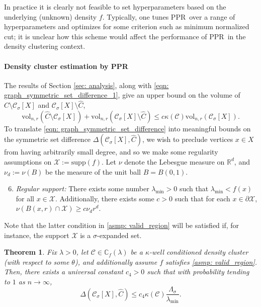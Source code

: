 \documentclass{article}
\newcommand{\vol}{\mathrm{vol}}
\newcommand{\Reals}{\mathbb{R}}
\newcommand{\Rd}{\Reals^d}
\newcommand{\1}{\mathbf{1}}
\newcommand{\Xbf}{X}             %
\newcommand{\Cbb}{\mathbb{C}}
\newcommand{\Cset}{\mathcal{C}}
\newcommand{\Csig}{\Cset_{\sigma}}
\newcommand{\Cest}{\widehat{C}}
\newcommand{\ppr}{{\sc PPR}}
\newcommand{\pprspace}{{\sc PPR~}}
\theoremstyle{aldenthm}
\newtheorem{theorem}{Theorem}
\theoremstyle{aldenrmrk}
\begin{document}
In practice it is clearly not feasible to set hyperparameters based on the underlying (unknown) density $f$. Typically, one tunes \pprspace over a range of hyperparameters and optimizes for some criterion such as minimum normalized cut; it is unclear how this scheme would affect the performance of \pprspace in the density clustering context.

\paragraph{Density cluster estimation by \ppr}

The results of Section \ref{sec: analysis}, along with \eqref{eqn: graph_symmetric_set_difference_1}, give an upper bound on the volume of $\Cest \setminus \Csig[\Xbf]$ and $\Csig[\Xbf] \setminus \Cest$,
\begin{equation}
\label{eqn: graph_symmetric_set_difference}
\vol_{n,r}(\Cest \setminus \Csig[\Xbf]) + \vol_{n,r}(\Csig[\Xbf] \setminus \Cest) \leq c \kappa(\Cset) \vol_{n,r}(\Csig[\Xbf]).
\end{equation}
To translate \eqref{eqn: graph_symmetric_set_difference} into meaningful bounds on the symmetric set difference $\Delta(\Csig[\Xbf], \Cest)$, we wish to preclude vertices $x \in \Xbf$ from having arbitrarily small degree, and so we make some regularity assumptions on $\mathcal{X} := \mathrm{supp}(f)$. Let $\nu$ denote the Lebesgue measure on $\Rd$, and $\nu_d := \nu(B)$ be the measure of the unit ball $B = B(0,1)$.
\begin{enumerate}[label=(A\arabic*)]
	\setcounter{enumi}{5}
	\item 
	\label{asmp: valid_region}
	\emph{Regular support:} There exists some number $\lambda_{\min} > 0$ such that $\lambda_{\min} < f(x)$ for all $x \in \mathcal{X}$. Additionally, there exists some $c > 0$ such that for each $x \in \partial \mathcal{X}$, $\nu(B(x,r) \cap \mathcal{X}) \geq c \nu_d r^d$.
\end{enumerate}
Note that the latter condition in \ref{asmp: valid_region} will be satisfied if, for instance, the support $\mathcal{X}$ is a $\sigma$-expanded set.

\begin{theorem}
	\label{thm: misclassification_rate}
	Fix $\lambda > 0$, let $\Cset \in \Cbb_f(\lambda)$ be a $\kappa$-well conditioned density cluster (with respect to some $\theta$), and additionally assume $f$ satisfies \ref{asmp: valid_region}. Then, there exists a universal constant $c_4 > 0$ such that with probability tending to $1$ as $n \to \infty$, 
	\begin{equation}
	\label{eqn: misclassification_rate_ub}
	\Delta(\Csig[\Xbf], \Cest) \leq c_4 \kappa(\Cset) \frac{\Lambda_{\sigma}}{\lambda_{\min}}.
	\end{equation}
\end{theorem}
\end{document}
